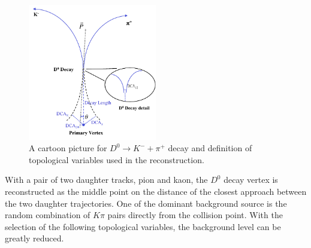 \documentclass[%
 reprint,	
 amsmath,amssymb,
 aps,
 prc,
]{revtex4-1}
\begin{document}
\begin{table}
\label{table:singlecut} 
\end{table}

\begin{figure}
\centering
\includegraphics[width=0.50\textwidth]{fig/D0carton.pdf}
\caption{A cartoon picture for $D^0\rightarrow K^-+\pi^+$ decay and definition of topological variables used in the reconstruction.}
\label{fig:D0carton} 
\end{figure}

With a pair of two daughter tracks, pion and kaon, the $D^0$ decay vertex is reconstructed as the middle point on the distance of the closest approach between the two daughter trajectories. One of the dominant background source is the random combination of $K\pi$ pairs directly from the collision point. With the selection of the following topological variables, the background level can be greatly reduced.
\end{document}
